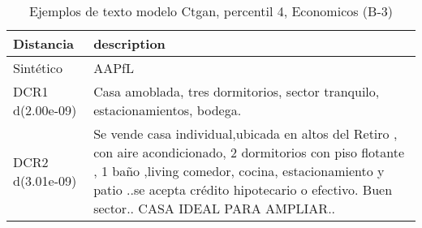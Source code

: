 \begin{table}[H]
\centering
\fontsize{10}{14}\selectfont
\caption{Ejemplos de texto modelo Ctgan, percentil 4, Economicos (B-3)}
\label{table-example-economicos-b-3-ctgan-4p-text}
\begin{tabular}{|l|m{35em}|}
\hline
\rowcolor[gray]{0.8}
Distancia & description \\
\hline Sintético & AAPfL \\
\hline DCR1 d(2.00e-09) & Casa amoblada, tres dormitorios, sector tranquilo, estacionamientos, bodega.  \\
\hline DCR2 d(3.01e-09) & Se vende casa individual,ubicada en altos del Retiro , con aire acondicionado,  2 dormitorios con piso flotante , 1 ba\~no ,living comedor, cocina, estacionamiento y patio ..se acepta cr\'edito hipotecario o efectivo. Buen sector.. CASA IDEAL PARA AMPLIAR.. \\
\hline
\end{tabular}
\end{table}
